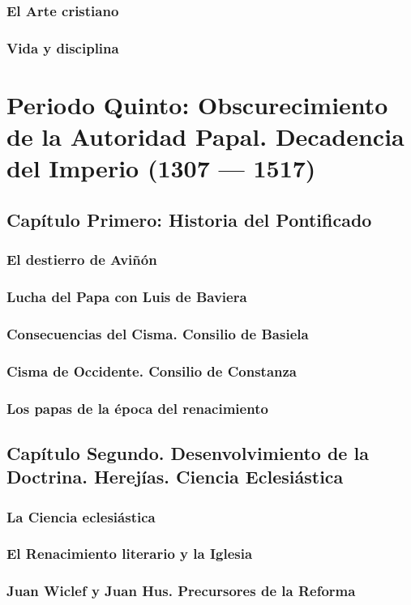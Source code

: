 \raggedbottom{} \documentclass[12pt, a4paper]{book}
\begin{document}
\section{El Arte cristiano}
\section{Vida y disciplina}
\part{Periodo Quinto: Obscurecimiento de la Autoridad Papal. Decadencia del Imperio (1307 --- 1517)}
\chapter{Capítulo Primero: Historia del Pontificado}
\section{El destierro de Aviñón}
\section{Lucha del Papa con Luis de Baviera}
\section{Consecuencias del Cisma. Consilio de Basiela}
\section{Cisma de Occidente. Consilio de Constanza}
\section{Los papas de la época del renacimiento}
\chapter{Capítulo Segundo. Desenvolvimiento de la Doctrina. Herejías. Ciencia Eclesiástica}
\section{La Ciencia eclesiástica}
\section{El Renacimiento literario y la Iglesia}
\section{Juan Wiclef y Juan Hus. Precursores de la Reforma}
\end{document}
